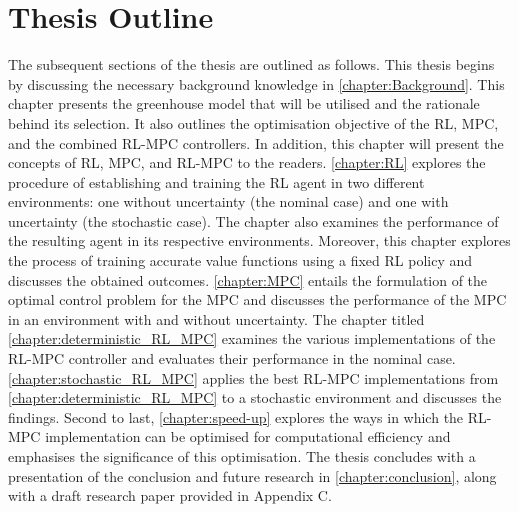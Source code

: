 \section{Thesis Outline}
The subsequent sections of the thesis are outlined as follows. This thesis begins by discussing the necessary background knowledge in \autoref{chapter:Background}.  This chapter presents the greenhouse model that will be utilised and the rationale behind its selection. It also outlines the optimisation objective of the RL, MPC, and the combined RL-MPC controllers. In addition, this chapter will present the concepts of RL, MPC, and RL-MPC to the readers. \autoref{chapter:RL} explores the procedure of establishing and training the RL agent in two different environments: one without uncertainty (the nominal case) and one with uncertainty (the stochastic case). The chapter also examines the performance of the resulting agent in its respective environments. Moreover, this chapter explores the process of training accurate value functions using a fixed RL policy and discusses the obtained outcomes. \autoref{chapter:MPC} entails the formulation of the optimal control problem for the MPC and discusses the performance of the MPC in an environment with and without uncertainty. The chapter titled \autoref{chapter:deterministic_RL_MPC} examines the various implementations of the RL-MPC controller and evaluates their performance in the nominal case. \autoref{chapter:stochastic_RL_MPC} applies the best RL-MPC implementations from \autoref{chapter:deterministic_RL_MPC} to a stochastic environment and discusses the findings. Second to last, \autoref{chapter:speed-up} explores the ways in which the RL-MPC implementation can be optimised for computational efficiency and emphasises the significance of this optimisation. The thesis concludes with a presentation of the conclusion and future research in \autoref{chapter:conclusion}, along with a draft research paper provided in Appendix C.

